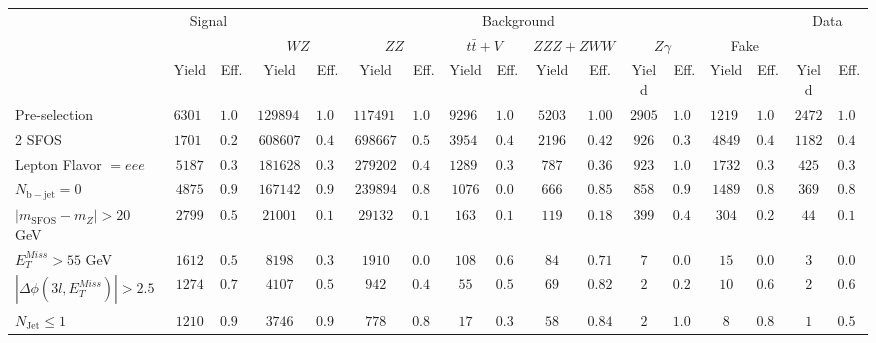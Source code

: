\begin{tabular}{l||c|c||c|c||c|c||c|c||c|c||c|c||c|c||c|c}
\hline
 &                 \multicolumn{2}{c||}{Signal}            &  \multicolumn{12}{c||}{Background} &  \multicolumn{2}{c}{Data} \\
 & &  & \multicolumn{2}{c||}{$WZ$} & \multicolumn{2}{c||}{$ZZ$} & \multicolumn{2}{c||}{$t\bar{t}+V$} & \multicolumn{2}{c||}{$ZZZ+ZWW$} & \multicolumn{2}{c||}{$Z\gamma$} & \multicolumn{2}{c||}{Fake} &  & \\ 
 & Yield & Eff. & Yield & Eff. & Yield & Eff. & Yield & Eff. & Yield & Eff. & Yield & Eff. & Yield & Eff. & Yield & Eff.\\
\hline\hline
Pre-selection &  $63019$ &  $1.00$ &  $1298941$ &  $1.00$ &  $1174916$ &  $1.00$ &  $92968$ &  $1.00$ &  $5203$ &  $1.00$ &  $2905$ &  $1.00$ &  $12192$ &  $1.00$ &  $2472$ &  $1.00$\\ 
\hline
2 SFOS &  $17014$ &  $0.27$ &  $608607$ &  $0.47$ &  $698667$ &  $0.59$ &  $39546$ &  $0.43$ &  $2196$ &  $0.42$ &  $926$ &  $0.32$ &  $4849$ &  $0.40$ &  $1182$ &  $0.48$\\ 
\hline
Lepton Flavor $= eee$ &  $5187$ &  $0.30$ &  $181628$ &  $0.30$ &  $279202$ &  $0.40$ &  $12893$ &  $0.33$ &  $787$ &  $0.36$ &  $923$ &  $1.00$ &  $1732$ &  $0.36$ &  $425$ &  $0.36$\\ 
\hline
$N_{\mathrm{b-jet}}=0$ &  $4875$ &  $0.94$ &  $167142$ &  $0.92$ &  $239894$ &  $0.86$ &  $1076$ &  $0.08$ &  $666$ &  $0.85$ &  $858$ &  $0.93$ &  $1489$ &  $0.86$ &  $369$ &  $0.87$\\ 
\hline
$| m_{\mathrm{SFOS}} - m_Z | >  20$ GeV &  $2799$ &  $0.57$ &  $21001$ &  $0.13$ &  $29132$ &  $0.12$ &  $163$ &  $0.15$ &  $119$ &  $0.18$ &  $399$ &  $0.47$ &  $304$ &  $0.20$ &  $44$ &  $0.12$\\ 
\hline
$E_{T}^{Miss} > 55$ GeV &  $1612$ &  $0.58$ &  $8198$ &  $0.39$ &  $1910$ &  $0.07$ &  $108$ &  $0.66$ &  $84$ &  $0.71$ &  $7$ &  $0.02$ &  $15$ &  $0.05$ &  $3$ &  $0.07$\\ 
\hline
$|\Delta\phi(3l,E_{T}^{Miss})| > 2.5$ &  $1274$ &  $0.79$ &  $4107$ &  $0.50$ &  $942$ &  $0.49$ &  $55$ &  $0.51$ &  $69$ &  $0.82$ &  $2$ &  $0.29$ &  $10$ &  $0.67$ &  $2$ &  $0.67$\\ 
\hline
$N_{\mathrm{Jet}} \leq 1$ &  $1210$ &  $0.95$ &  $3746$ &  $0.91$ &  $778$ &  $0.83$ &  $17$ &  $0.31$ &  $58$ &  $0.84$ &  $2$ &  $1.00$ &  $8$ &  $0.80$ &  $1$ &  $0.50$\\ 
\hline
\end{tabular}
